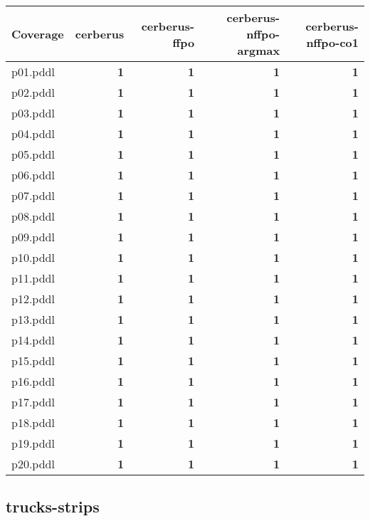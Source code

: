 \documentclass{article}
\begin{document}
\begin{tabular}{@{}lrrrr@{}}
Coverage & cerberus & cerberus-ffpo & cerberus-nffpo-argmax & cerberus-nffpo-co1 \\
\midrule
p01.pddl & \textbf{1} & \textbf{1} & \textbf{1} & \textbf{1} \\
p02.pddl & \textbf{1} & \textbf{1} & \textbf{1} & \textbf{1} \\
p03.pddl & \textbf{1} & \textbf{1} & \textbf{1} & \textbf{1} \\
p04.pddl & \textbf{1} & \textbf{1} & \textbf{1} & \textbf{1} \\
p05.pddl & \textbf{1} & \textbf{1} & \textbf{1} & \textbf{1} \\
p06.pddl & \textbf{1} & \textbf{1} & \textbf{1} & \textbf{1} \\
p07.pddl & \textbf{1} & \textbf{1} & \textbf{1} & \textbf{1} \\
p08.pddl & \textbf{1} & \textbf{1} & \textbf{1} & \textbf{1} \\
p09.pddl & \textbf{1} & \textbf{1} & \textbf{1} & \textbf{1} \\
p10.pddl & \textbf{1} & \textbf{1} & \textbf{1} & \textbf{1} \\
p11.pddl & \textbf{1} & \textbf{1} & \textbf{1} & \textbf{1} \\
p12.pddl & \textbf{1} & \textbf{1} & \textbf{1} & \textbf{1} \\
p13.pddl & \textbf{1} & \textbf{1} & \textbf{1} & \textbf{1} \\
p14.pddl & \textbf{1} & \textbf{1} & \textbf{1} & \textbf{1} \\
p15.pddl & \textbf{1} & \textbf{1} & \textbf{1} & \textbf{1} \\
p16.pddl & \textbf{1} & \textbf{1} & \textbf{1} & \textbf{1} \\
p17.pddl & \textbf{1} & \textbf{1} & \textbf{1} & \textbf{1} \\
p18.pddl & \textbf{1} & \textbf{1} & \textbf{1} & \textbf{1} \\
p19.pddl & \textbf{1} & \textbf{1} & \textbf{1} & \textbf{1} \\
p20.pddl & \textbf{1} & \textbf{1} & \textbf{1} & \textbf{1} \\
\end{tabular}

\hypertarget{coverage-trucks-strips}{}
\subsection*{trucks-strips}
\end{document}
